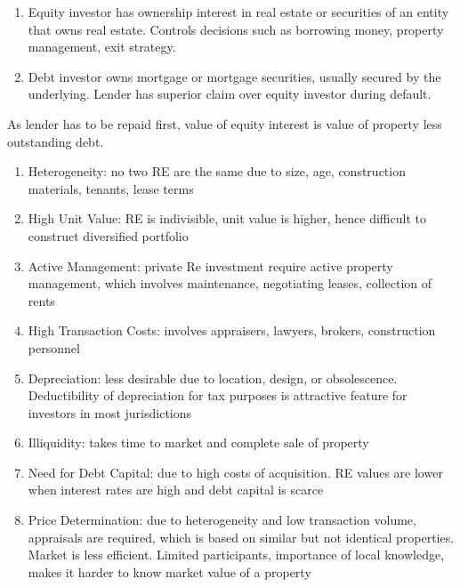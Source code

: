 \begin{remark} 
\begin{enumerate}[label=\roman*.]
\setlength{\itemsep}{0pt}
\item Equity investor has ownership interest in real estate or securities of an entity that owns real estate. Controls decisions such as borrowing money, property management, exit strategy.
\item Debt investor owns mortgage or mortgage securities, usually secured by the underlying. Lender has superior claim over equity investor during default.
\end{enumerate}
As lender has to be repaid first, value of equity interest is value of property less outstanding debt.
\end{remark}

\begin{remark} 
\begin{enumerate}[label=\roman*.]
\setlength{\itemsep}{0pt}
\item Heterogeneity: no two RE are the same due to size, age, construction materials, tenants, lease terms
\item High Unit Value: RE is indivisible, unit value is higher, hence difficult to construct diversified portfolio
\item Active Management: private Re investment require active property management, which involves maintenance, negotiating leases, collection of rents
\item High Transaction Costs: involves appraisers, lawyers, brokers, construction personnel
\item Depreciation: less desirable due to location, design, or obsolescence. Deductibility of depreciation for tax purposes is attractive feature for investors in most jurisdictions
\item Illiquidity: takes time to market and complete sale of property
\item Need for Debt Capital: due to high costs of acquisition. RE values are lower when interest rates are high and debt capital is scarce
\item Price Determination: due to heterogeneity and low transaction volume, appraisals are required, which is based on similar but not identical properties. Market is less efficient. Limited participants, importance  of local knowledge, makes it harder to know market value of a property
\end{enumerate}
\end{remark}

